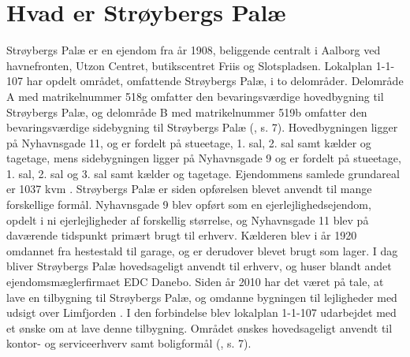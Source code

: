 \section{Hvad er Strøybergs Palæ}
Strøybergs Palæ er en ejendom fra år 1908, beliggende centralt i Aalborg ved havnefronten, Utzon Centret, butikscentret Friis og Slotspladsen.
\newline \indent{     }  Lokalplan 1-1-107 har opdelt området, omfattende Strøybergs Palæ, i to delområder. Delområde A med matrikelnummer 518g omfatter den bevaringsværdige hovedbygning til Strøybergs Palæ, og delområde B med matrikelnummer 519b omfatter den bevaringsværdige sidebygning til Strøybergs Palæ (\citep{lokalplan}, s. 7). Hovedbygningen ligger på Nyhavnsgade 11, og er fordelt på stueetage, 1. sal, 2. sal samt kælder og tagetage, mens sidebygningen ligger på Nyhavnsgade 9 og er fordelt på stueetage, 1. sal, 2. sal og 3. sal samt kælder og tagetage. Ejendommens samlede grundareal er 1037 kvm \citep{byggesagen}.
\newline 
\newline 
Strøybergs Palæ er siden opførelsen blevet anvendt til mange forskellige formål. 
\newline \indent{     }  Nyhavnsgade 9 blev opført som en ejerlejlighedsejendom, opdelt i ni ejerlejligheder af forskellig størrelse, og Nyhavnsgade 11 blev på daværende tidspunkt primært brugt til erhverv. 
\newline \indent{     }  Kælderen blev i år 1920 omdannet fra hestestald til garage, og er derudover blevet brugt som lager.
\newline \indent{     }  I dag bliver Strøybergs Palæ hovedsageligt anvendt til erhverv, og huser blandt andet ejendomsmæglerfirmaet EDC Danebo.
\newline \indent{     }  Siden år 2010 har det været på tale, at lave en tilbygning til Strøybergs Palæ, og omdanne bygningen til lejligheder med udsigt over Limfjorden \citep{link}. I den forbindelse blev lokalplan 1-1-107 udarbejdet med et ønske om at lave denne tilbygning. Området ønskes hovedsageligt anvendt til kontor- og serviceerhverv samt boligformål (\citep{lokalplan}, s. 7).
